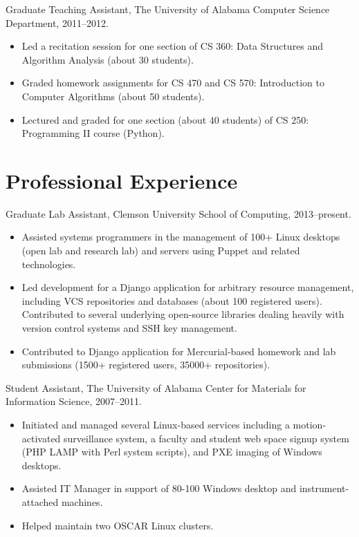 \documentclass[12pt]{memoir}
\begin{document}
Graduate Teaching Assistant, The University of Alabama Computer Science
Department, 2011--2012.

\begin{itemize}
  \item Led a recitation session for one section of CS 360: Data Structures and
        Algorithm Analysis (about 30 students).
  \item Graded homework assignments for CS 470 and CS 570: Introduction to
        Computer Algorithms (about 50 students).
  \item Lectured and graded for one section (about 40 students) of CS 250:
        Programming II course (Python).
\end{itemize}

\section*{Professional Experience}

Graduate Lab Assistant, Clemson University School of Computing, 2013--present.

\begin{itemize}
  \item Assisted systems programmers in the management of 100+ Linux desktops (open lab
        and research lab) and servers using Puppet and related technologies.
  \item Led development for a Django application for arbitrary resource
        management, including VCS repositories and databases (about 100
        registered users). Contributed to several underlying open-source
        libraries dealing heavily with version control systems and SSH key
        management.
  \item Contributed to Django application for Mercurial-based homework and lab
        submissions (1500+ registered users, 35000+ repositories).
\end{itemize}

Student Assistant, The University of Alabama Center for Materials for
Information Science, 2007--2011.

\begin{itemize}
  \item Initiated and managed several Linux-based services including a
        motion-activated surveillance system, a faculty and student web space
        signup system (PHP LAMP with Perl system scripts), and PXE imaging of
        Windows desktops.
  \item Assisted IT Manager in support of 80-100 Windows desktop and
        instrument-attached machines.
  \item Helped maintain two OSCAR Linux clusters.
\end{itemize}

\nocite{*}


\end{document}
